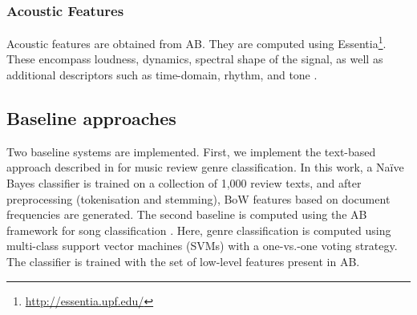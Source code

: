 \subsubsection{Acoustic Features}

Acoustic features are obtained from AB. They are computed using Essentia\footnote{\url{http://essentia.upf.edu/}}. These encompass loudness, dynamics, spectral shape of the signal, as well as additional descriptors such as time-domain, rhythm, and tone \cite{Porter2015}.%



\subsection{Baseline approaches}
\label{sec:similarity:baselines}
Two baseline systems are implemented. First, we implement the text-based approach described in \cite{Hu2005} for music review genre classification. In this work, a Na\"{i}ve Bayes classifier is trained on a collection of 1,000 review texts, and after preprocessing (tokenisation and stemming), BoW features based on document frequencies are generated.
The second baseline is computed using the AB framework for song classification \cite{Porter2015}. Here, genre classification is computed using  multi-class support vector machines (SVMs) with a one-vs.-one voting strategy. The classifier is trained with the set of low-level features present in AB. %

